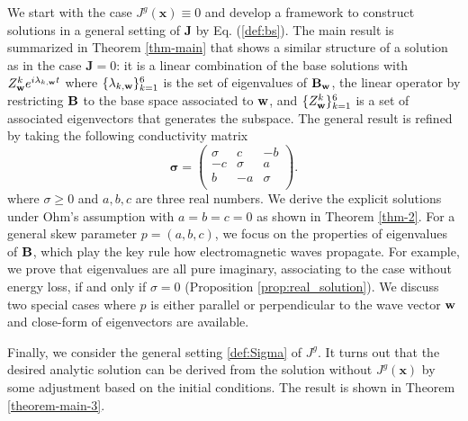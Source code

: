 \documentclass[10pt,reqno]{amsart}
\newcommand{\bB}{{\bf B}}
\newcommand{\bS}{\boldsymbol{\sigma}}
\renewcommand{\(}{\left(}
\renewcommand{\)}{\right)}
\newcommand{\bw}{{\bf w}}
\newcommand{\bx}{\mathbf{x}}
\newcommand{\bJ}{\mathbf{J}}
\numberwithin{equation}{section}
\begin{document}
We start with the case $J^g(\bx)\equiv 0$ and develop a framework to construct solutions in a general setting of $\bJ$ by Eq. (\ref{def:bs}).  The main result is summarized in Theorem \ref{thm-main} that shows a similar structure of a solution as in the case $\bJ=0$: it is a linear combination of the base solutions with $Z^k_{\bw}e^{i\lambda_{k,\bw}t}$ where $\{\lambda_{k,\bw}\}_{k=1}^6$ is the set of eigenvalues of $\bB_{\bw}$,  the linear operator by restricting $\bB$ to the base space associated to $\bw$, and $\{ Z^k_{\bw}\}_{k=1}^6$ is a set of associated eigenvectors that generates the subspace.  The general result is refined by taking the following conductivity matrix
\begin{equation}\label{def:bs-skew}
	\bS= \left(
	\begin{array}{ccc}
		\sigma & c & -b\\
		-c & \sigma & a \\
		b & -a & \sigma \\
	\end{array}
	\right).
\end{equation}
where $\sigma\ge0$ and $a,b,c$ are three real numbers.  We derive the explicit solutions under Ohm's assumption with $a=b=c=0$ as shown in Theorem \ref{thm-2}. For a general skew parameter $p=(a,b,c)$, we focus on the properties of eigenvalues of $\bB$, which play the key rule how electromagnetic waves propagate.  For example, we prove that eigenvalues are all pure imaginary, associating to the case without energy loss, if and only if $\sigma=0$ (Proposition \ref{prop:real_solution}).  We discuss two special cases where $p$ is either parallel or perpendicular to the wave vector $\bw$ and close-form of eigenvectors are available.

Finally, we consider the general setting \ref{def:Sigma} of $J^g$.  It turns out that the desired analytic solution can be derived from the solution without $J^g(\bx)$ by some adjustment based on the initial conditions.  The result is shown in Theorem \ref{theorem-main-3}.
\end{document}

